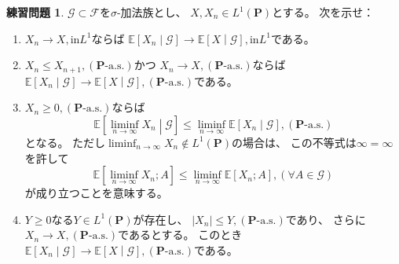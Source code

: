 \documentclass[uplatex]{jsarticle}
\theoremstyle{definition}
\newtheorem{prob}[prob]{練習問題}
\def\P{\mathbf{P}}
\def\E{\mathbb{E}}
\def\mcF{\mathcal{F}}
\def\mcG{\mathcal{G}}
\begin{document}
\begin{prob}\label{prob: 1.8}
  \(\mcG\subset \mcF\)を\(\sigma\)-加法族とし、
  \(X,X_n\in L^1(\P)\)とする。
  次を示せ：
  \begin{enumerate}
    \item \label{enumi: prob: 1.8-1}
    \(X_n \to X, \text{in} L^1\)ならば
    \(\E\left[X_n\middle|\mcG\right] \to \E\left[X\middle|\mcG\right]
    , \text{in} L^1\)である。
    \item \label{enumi: prob: 1.8-2}
    \(X_n\leq X_{n+1}, (\P\text{-a.s.})\)かつ
    \(X_n\to X, (\P\text{-a.s.})\)ならば
    \(\E\left[X_n\middle|\mcG\right] \to \E\left[X\middle|\mcG\right],
    (\P\text{-a.s.})\)である。
    \item \label{enumi: prob: 1.8-3}
    \(X_n \geq 0, (\P\text{-a.s.})\)ならば
    \[
    \E\left[ \liminf_{n\to \infty} X_n\middle|\mcG \right]
    \leq \liminf_{n\to \infty}\E\left[X_n\middle|\mcG\right],
    (\P\text{-a.s.})
    \]
    となる。
    ただし\(\liminf_{n\to \infty} X_n\not\in L^1(\P)\)の場合は、
    この不等式は\(\infty = \infty\)を許して
    \[
    \E\left[ \liminf_{n\to \infty} X_n; A \right]
    \leq \liminf_{n\to \infty}\E\left[X_n; A\right],
    (\forall A\in\mcG)
    \]
    が成り立つことを意味する。
    \item \label{enumi: prob: 1.8-4}
    \(Y\geq 0\)なる\(Y\in L^1(\P)\)が存在し、
    \(|X_n| \leq Y , (\P\text{-a.s.})\)であり、
    さらに\(X_n\to X, (\P\text{-a.s.})\)であるとする。
    このとき
    \(\E\left[X_n\middle|\mcG\right] \to \E\left[X\middle|\mcG\right],
    (\P\text{-a.s.})\)である。
  \end{enumerate}
\end{prob}
\end{document}
